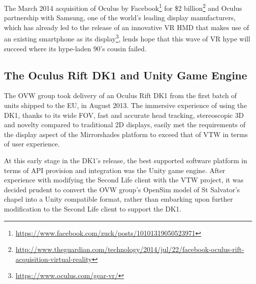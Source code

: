 The March 2014 acquisition of Oculus by Facebook\footnote{\url{https://www.facebook.com/zuck/posts/10101319050523971}} for \$2 billion\footnote{\url{http://www.theguardian.com/technology/2014/jul/22/facebook-oculus-rift-acquisition-virtual-reality}} and Oculus partnership with Samsung, one of the world's leading display manufacturers, which has already led to the release of an innovative VR HMD that makes use of an existing smartphone as its display\footnote{\url{https://www.oculus.com/gear-vr/}}, lends hope that this wave of VR hype will succeed where its hype-laden 90's cousin failed.




\subsection{The Oculus Rift DK1 and Unity Game Engine}

The OVW group took delivery of an Oculus Rift DK1 from the first batch of units shipped to the EU, in August 2013. The immersive experience of using the DK1, thanks to its wide FOV, fast and accurate head tracking, stereoscopic 3D and novelty compared to traditional 2D displays, easily met the requirements of the display aspect of the Mirrorshades platform to exceed that of VTW in terms of user experience.

At this early stage in the DK1's release, the best supported software platform in terms of API provision and integration was the Unity game engine. After experience with modifying the Second Life client with the VTW project, it was decided prudent to convert the OVW group's OpenSim model of St Salvator's chapel into a Unity compatible format, rather than embarking upon further modification to the Second Life client to support the DK1.

